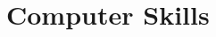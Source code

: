 \documentclass[10pt,a4paper, colorlinks, sans]{moderncv}        %
\begin{document}

\section{Computer Skills}



\cvskilllegend*[1em]{}%

\end{document}
